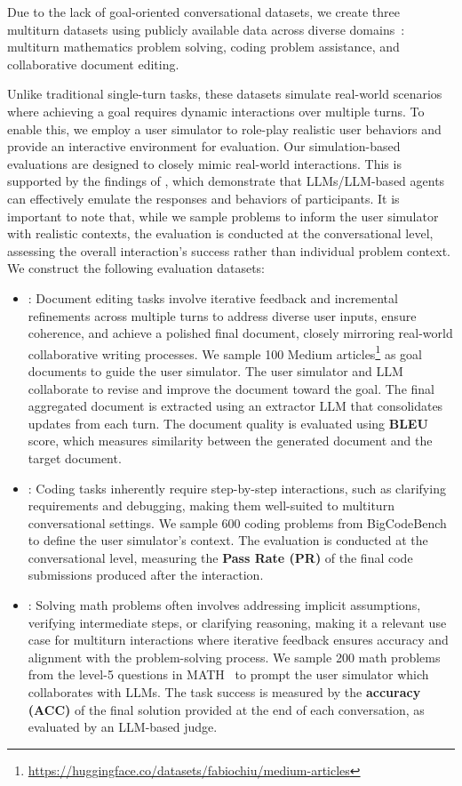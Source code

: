 Due to the lack of goal-oriented conversational datasets, we create three multiturn datasets using publicly available data across diverse domains~\citep{math, bigcodebench, medium}: multiturn mathematics problem solving, coding problem assistance, and collaborative document editing.

Unlike traditional single-turn tasks, these datasets simulate real-world scenarios where achieving a goal requires dynamic interactions over multiple turns. To enable this, we employ a user simulator to role-play realistic user behaviors and provide an interactive environment for evaluation. Our simulation-based evaluations are designed to closely mimic real-world interactions. This is supported by the findings of \citet{simulate1000}, which demonstrate that LLMs/LLM-based agents can effectively emulate the responses and behaviors of participants. It is important to note that, while we sample problems to inform the user simulator with realistic contexts, the evaluation is conducted at the conversational level, assessing the overall interaction's success rather than individual problem context. We construct the following evaluation datasets:
%
\begin{itemize}%
    \item \textbf{\doct}: Document editing tasks involve iterative feedback and incremental refinements across multiple turns to address diverse user inputs, ensure coherence, and achieve a polished final document, closely mirroring real-world collaborative writing processes. We sample 100 Medium articles\footnote{\url{https://huggingface.co/datasets/fabiochiu/medium-articles}} as goal documents to guide the user simulator. The user simulator and LLM collaborate to revise and improve the document toward the goal. The final aggregated document is extracted using an extractor LLM that consolidates updates from each turn. The document quality is evaluated using \textbf{{BLEU}} score, which measures similarity between the generated document and the target document.
    
    \item \textbf{\codet}: Coding tasks inherently require step-by-step interactions, such as clarifying requirements and debugging, making them well-suited to multiturn conversational settings. We sample 600 coding problems from BigCodeBench~\citep{bigcodebench} to define the user simulator's context. The evaluation is conducted at the conversational level, measuring the \textbf{{Pass Rate (PR)}} of the final code submissions produced after the interaction.
    \item \textbf{\mathct}: Solving math problems often involves addressing implicit assumptions, verifying intermediate steps, or clarifying reasoning, making it a relevant use case for multiturn interactions where iterative feedback ensures accuracy and alignment with the problem-solving process. We sample 200 math problems from the level-5 questions in MATH~\citep{math} to prompt the user simulator which collaborates with LLMs. The task success is measured by the \textbf{{accuracy (ACC})} of the final solution provided at the end of each conversation, as evaluated by an LLM-based judge.
\end{itemize}


